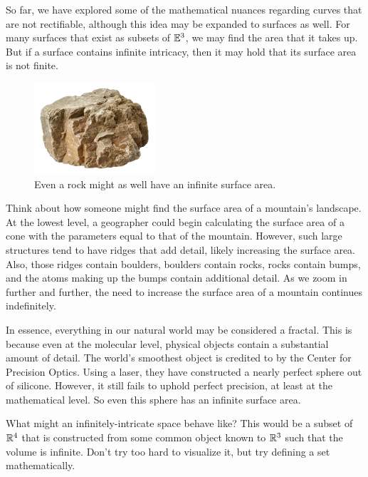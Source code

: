 So far, we have explored some of the mathematical nuances regarding curves that are not rectifiable, although this idea may be expanded to surfaces as well. For many surfaces that exist as subsets of $\mathbb{E}^3$, we may find the area that it takes up. But if a surface contains infinite intricacy, then it may hold that its surface area is not finite. \par

\begin{figure}
  \begin{center}
    \vspace{-5mm}
    \includegraphics[width=0.4\textwidth]{Images/Chap1/1.1.end.jpg}
  \end{center}
  \caption{Even a rock might as well have an infinite surface area.}
\end{figure}

Think about how someone might find the surface area of a mountain's landscape. At the lowest level, a geographer could begin calculating the surface area of a cone with the parameters equal to that of the mountain. However, such large structures tend to have ridges that add detail, likely increasing the surface area. Also, those ridges contain boulders, boulders contain rocks, rocks contain bumps, and the atoms making up the bumps contain additional detail. As we zoom in further and further, the need to increase the surface area of a mountain continues indefinitely. \par

In essence, everything in our natural world may be considered a fractal. This is because even at the molecular level, physical objects contain a substantial amount of detail. The world's smoothest object is credited to by the Center for Precision Optics. Using a laser, they have constructed a nearly perfect sphere out of silicone. However, it still fails to uphold perfect precision, at least at the mathematical level. So even this sphere has an infinite surface area. 

\begin{exercise}[Challenge]
    What might an infinitely-intricate space behave like? This would be a subset of $\mathbb{R}^4$ that is constructed from some common object known to $\mathbb{R}^3$ such that the volume is infinite. Don't try too hard to visualize it, but try defining a set mathematically.
\end{exercise}

